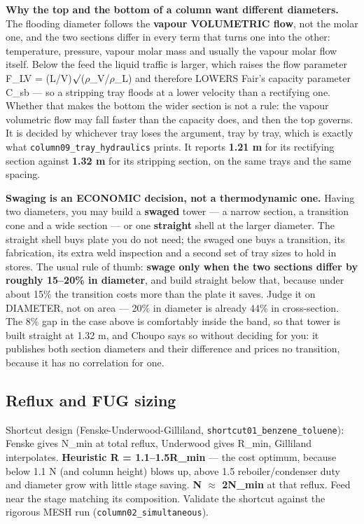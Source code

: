 \documentclass[11pt,a4paper]{article}
\begin{document}
\textbf{Why the top and the bottom of a column want different diameters.}
The flooding diameter follows the \textbf{vapour VOLUMETRIC flow}, not the
molar one, and the two sections differ in every term that turns one into the
other: temperature, pressure, vapour molar mass and usually the vapour molar
flow itself. Below the feed the liquid traffic is larger, which raises the flow
parameter F\_LV = (L/V)\(\surd\)(\(\rho\)\_V/\(\rho\)\_L) and therefore
LOWERS Fair's capacity parameter C\_sb --- so a stripping tray floods at a
lower velocity than a rectifying one. Whether that makes the bottom the wider
section is not a rule: the vapour volumetric flow may fall faster than the
capacity does, and then the top governs. It is decided by whichever tray loses
the argument, tray by tray, which is exactly what
\texttt{column09\_tray\_hydraulics} prints. It reports \textbf{1.21 m} for
its rectifying section against \textbf{1.32 m} for its stripping section, on
the same trays and the same spacing.

\textbf{Swaging is an ECONOMIC decision, not a thermodynamic one.} Having two
diameters, you may build a \textbf{swaged} tower --- a narrow section, a
transition cone and a wide section --- or one \textbf{straight} shell at the
larger diameter. The straight shell buys plate you do not need; the swaged one
buys a transition, its fabrication, its extra weld inspection and a second set
of tray sizes to hold in stores. The usual rule of thumb: \textbf{swage only
when the two sections differ by roughly 15--20\% in diameter}, and build
straight below that, because under about 15\% the transition costs more than
the plate it saves. Judge it on DIAMETER, not on area --- 20\% in diameter is
already 44\% in cross-section. The 8\% gap in the case above is comfortably
inside the band, so that tower is built straight at 1.32 m, and Choupo says so
without deciding for you: it publishes both section diameters and their
difference and prices no transition, because it has no correlation for one.

\hypertarget{reflux-and-fug-sizing}{%
\subsection{Reflux and FUG sizing}\label{reflux-and-fug-sizing}}

Shortcut design (Fenske-Underwood-Gilliland,
\texttt{shortcut01\_benzene\_toluene}): Fenske gives N\_min at total
reflux, Underwood gives R\_min, Gilliland interpolates.
\textbf{Heuristic R = 1.1--1.5\textperiodcentered{}R\_min} --- the cost optimum, because
below 1.1 N (and column height) blows up, above 1.5 reboiler/condenser
duty and diameter grow with little stage saving. \textbf{N \(\approx\) 2\textperiodcentered{}N\_min}
at that reflux. Feed near the stage matching its composition. Validate
the shortcut against the rigorous MESH run
(\texttt{column02\_simultaneous}).
\end{document}
